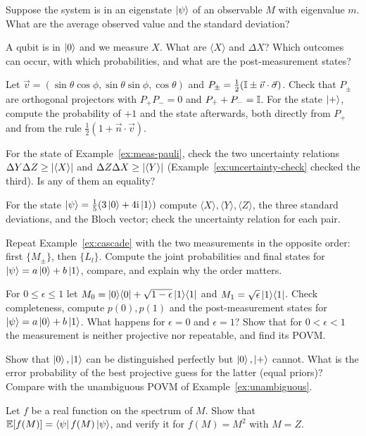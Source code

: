 \begin{exerciseset}
   Suppose the system is in an eigenstate $\left|\psi\right\rangle$ of an observable $M$ with eigenvalue $m$. What are the average observed value and the standard deviation?

   A qubit is in $\left|0\right\rangle$ and we measure $X$. What are $\langle X\rangle$ and $\Delta X$? Which outcomes can occur, with which probabilities, and what are the post-measurement states?

   Let $\vec v=(\sin\theta\cos\phi,\sin\theta\sin\phi,\cos\theta)$ and $P_\pm=\frac12(\mathbb{I}\pm\vec v\cdot\vec\sigma)$. Check that $P_\pm$ are orthogonal projectors with $P_+P_-=0$ and $P_++P_-=\mathbb{I}$. For the state $\left|+\right\rangle$, compute the probability of $+1$ and the state afterwards, both directly from $P_+$ and from the rule $\tfrac12(1+\vec n\cdot\vec v)$.\label{ex:vn-sigma-eig2}

   For the state of Example~\ref{ex:meas-pauli}, check the two uncertainty relations $\Delta Y\Delta Z\ge\left|\langle X\rangle\right|$ and $\Delta Z\Delta X\ge\left|\langle Y\rangle\right|$ (Example~\ref{ex:uncertainty-check} checked the third). Is any of them an equality?

   For the state $\left|\psi\right\rangle=\tfrac15(3\left|0\right\rangle+4\mathrm{i}\left|1\right\rangle)$ compute $\langle X\rangle,\langle Y\rangle,\langle Z\rangle$, the three standard deviations, and the Bloch vector; check the uncertainty relation for each pair.

   Repeat Example~\ref{ex:cascade} with the two measurements in the opposite order: first $\{M_\pm\}$, then $\{L_l\}$. Compute the joint probabilities and final states for $\left|\psi\right\rangle=a\left|0\right\rangle+b\left|1\right\rangle$, compare, and explain why the order matters.

  \label{ex:epsilon-meas} For $0\le\epsilon\le1$ let $M_0=\left|0\right\rangle\!\left\langle0\right|+\sqrt{1-\epsilon}\left|1\right\rangle\!\left\langle1\right|$ and $M_1=\sqrt\epsilon\left|1\right\rangle\!\left\langle1\right|$. Check completeness, compute $p(0),p(1)$ and the post-measurement states for $\left|\psi\right\rangle=a\left|0\right\rangle+b\left|1\right\rangle$. What happens for $\epsilon=0$ and $\epsilon=1$? Show that for $0<\epsilon<1$ the measurement is neither projective nor repeatable, and find its POVM.

   Show that $\left|0\right\rangle,\left|1\right\rangle$ can be distinguished perfectly but $\left|0\right\rangle,\left|+\right\rangle$ cannot. What is the error probability of the best projective guess for the latter (equal priors)? Compare with the unambiguous POVM of Example~\ref{ex:unambiguous}.

   Let $f$ be a real function on the spectrum of $M$. Show that $\mathbb E[f(M)]=\left\langle\psi\right| f(M)\left|\psi\right\rangle$, and verify it for $f(M)=M^2$ with $M=Z$.


\end{exerciseset}
